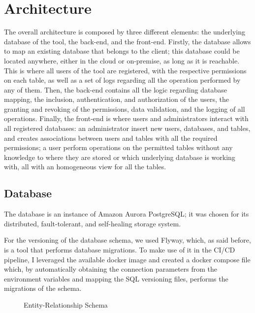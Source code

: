 \section{Architecture}
The overall architecture is composed by three different elements: the underlying database of the tool, the back-end, and the front-end.
Firstly, the database allows to map an existing database that belongs to the client; this database could be located anywhere, either in the cloud or on-premise, as long as it is reachable. This is where all users of the tool are registered, with the respective permissions on each table, as well as a set of logs regarding all the operation performed by any of them.   
Then, the back-end contains all the logic regarding database mapping, the inclusion, authentication, and authorization of the users, the granting and revoking of the permissions, data validation, and the logging of all operations.
Finally, the front-end is where users and administrators interact with all registered databases: an administrator insert new users, databases, and tables, and creates associations between users and tables with all the required permissions; a user perform operations on the permitted tables without any knowledge to where they are stored or which underlying database is working with, all with an homogeneous view for all the tables.

\subsection{Database}
The database is an instance of Amazon Aurora PostgreSQL; it was chosen for its distributed, fault-tolerant, and self-healing storage system.

For the versioning of the database schema, we used Flyway, which, as said before, is a tool that performs database migrations. To make use of it in the CI/CD pipeline, I leveraged the available docker image and created a docker compose file which, by automatically obtaining the connection parameters from the environment variables and mapping the SQL versioning files, performs the migrations of the schema. 

\begin{figure}[htp]
    \centering
    
    \caption{Entity-Relationship Schema}
    \label{fig:ER}
\end{figure}


